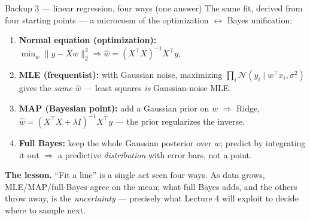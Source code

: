 \documentclass[10pt, aspectratio=169]{beamer}
\begin{document}
\begin{frame}{Backup 3 --- linear regression, four ways (one answer)}
\footnotesize
The same fit, derived from four starting points --- a microcosm of the optimization $\leftrightarrow$ Bayes unification:
\begin{enumerate}\setlength\itemsep{2pt}
\item \textbf{Normal equation (optimization):} $\min_w\|y-Xw\|_2^2 \Rightarrow \hat w = (X^\top X)^{-1}X^\top y$.
\item \textbf{MLE (frequentist):} with Gaussian noise, maximizing $\prod_i \mathcal{N}(y_i\mid w^\top x_i,\sigma^2)$ gives the \emph{same} $\hat w$ --- least squares \emph{is} Gaussian-noise MLE.
\item \textbf{MAP (Bayesian point):} add a Gaussian prior on $w$ $\Rightarrow$ Ridge, $\hat w = (X^\top X + \lambda I)^{-1}X^\top y$ --- the prior regularizes the inverse.
\item \textbf{Full Bayes:} keep the whole Gaussian posterior over $w$; predict by integrating it out $\Rightarrow$ a predictive \emph{distribution} with error bars, not a point.
\end{enumerate}
\medskip
\textbf{The lesson.} ``Fit a line'' is a single act seen four ways. As data grows, MLE/MAP/full-Bayes agree on the mean; what full Bayes adds, and the others throw away, is the \emph{uncertainty} --- precisely what Lecture 4 will exploit to decide where to sample next.
\end{frame}
\end{document}
